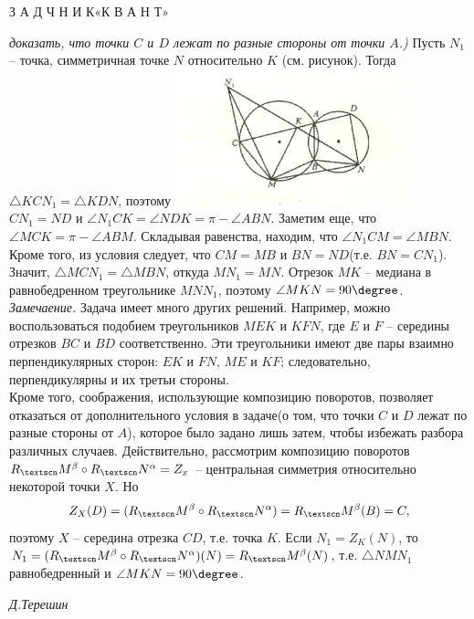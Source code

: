 \begin{center}
    \textsf{З А Д Ч Н И К\hspace{0.3cm}«К В А Н Т»}
\end{center}
\begin{multicols}{2}
\textit{доказать, что точки $C$ и $D$ лежат по разные стороны от точки $A$.)}
Пусть $N_1$ -- точка, симметричная точке $N$ относительно $K$ (см. рисунок). Тогда $\triangle KCN_1 = \triangle KDN$, поэтому
\includegraphics[width=0.5\textwidth]{pic1}
$CN_1 = ND$ и $\angle N_1CK = \angle NDK = \pi - \angle ABN$. Заметим еще, что $\angle MCK = \pi - \angle ABM$. Складывая равенства, находим, что $\angle N_1CM = \angle MBN$. Кроме того, из условия следует, что $CM = MB$ и $BN = ND$(т.е. $BN = CN_1$). Значит, $\triangle MCN_1 = \triangle MBN$, откуда $MN_1 = MN$. Отрезок $MK$ -- медиана в равнобедренном треугольнике $MNN_1$, поэтому $\angle MKN = 90\degree$.\\ \textit{Замечаение.} Задача имеет много других решений. Например, можно воспользоваться подобием треугольников $MEK$ и $KFN$, где $E$ и $F$ -- середины отрезков $BC$ и $BD$ соответственно. Эти треугольники имеют две пары взаимно перпендикулярных сторон: $EK$ и $FN$, $ME$ и $KF$; следовательно, перпендикулярны и их третьи стороны.\\Кроме того, соображения, использующие композицию поворотов, позволяет отказаться от дополнительного условия в задаче(о том, что точки $C$ и $D$ лежат по разные стороны от $A$), которое было задано лишь затем, чтобы избежать разбора различных случаев. Действительно, рассмотрим композицию поворотов\\$R_\textscn M^\beta \circ R_\textscn N^\alpha = Z_x$ -- центральная симметрия относительно некоторой точки $X$. Но \[Z_X(D) = (R_\textscn M^\beta \circ R_\textscn N^\alpha) = R_\textscn M^\beta(B) = C,\] поэтому $X$ -- середина отрезка $CD$, т.е. точка $K$. Если $N_1 = Z_K(N)$, то $N_1 = (R_\textscn M^\beta \circ R_\textscn N^\alpha)(N) = R_\textscn M^\beta(N)$, т.е. $\triangle NMN_1$ равнобедренный и $\angle MKN = 90\degree$.
\begin{flushright}
\textit{Д.Терешин}
\end{flushright}

\end{multicols}
